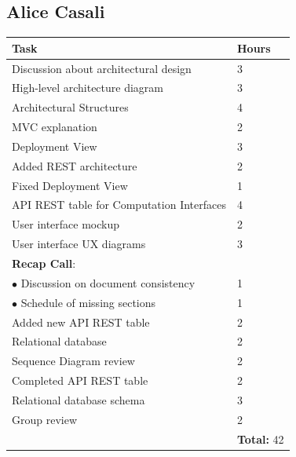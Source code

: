 \documentclass{report}
\begin{document}
\subsection*{Alice Casali}
\begin{table}[!ht]
	\begin{tabular}{|C{.60\textwidth}||C{.20\textwidth}|}
		\toprule
        \textbf{Task} & \textbf{Hours}\\
        \midrule
        Discussion about architectural design & 3\\
        \midrule
        High-level architecture diagram & 3\\
        \midrule
        Architectural Structures & 4\\
        \midrule
        MVC explanation & 2\\
        \midrule
        Deployment View & 3\\
        \midrule
        Added REST architecture & 2 \\
        \midrule
        Fixed Deployment View & 1\\
        \midrule
        API REST table for Computation Interfaces & 4\\
		\midrule
		User interface mockup & 2\\
        \midrule
        User interface UX diagrams & 3\\
        \midrule
		\small{\textbf{Recap Call}}: & \\
		\vspace{.2mm}
		$\bullet$ Discussion on document consistency & \vspace{.2mm} 1\\
        $\bullet$ Schedule of missing sections & 1\\
        \midrule
        Added new API REST table & 2\\
        \midrule
        Relational database & 2\\
        \midrule
		Sequence Diagram review & 2\\
        \midrule
        Completed API REST table & 2\\
        \midrule
        Relational database schema & 3\\
        \midrule
        Group review & 2\\
        \midrule
		& \textbf{Total:} 42\\
		\bottomrule
	\end{tabular}
\end{table}
\end{document}
